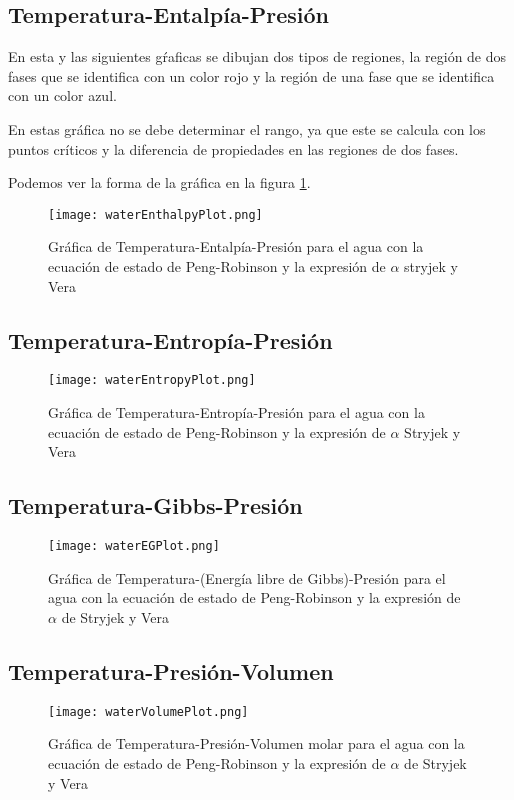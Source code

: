 	\subsection{Temperatura-Entalpía-Presión}\label{subsec:tep}

		En esta y las siguientes gŕaficas se dibujan dos tipos de regiones, la región de dos fases que se identifica con un color rojo y la región de una fase que se identifica con un color azul.

		En estas gráfica no se debe determinar el rango, ya que este se calcula con los puntos críticos y la diferencia de propiedades en las regiones de dos fases. 

		Podemos ver la forma de la gráfica en la figura \ref{fig:hplot}.

		\begin{figure}[!h]
			\texttt{[image: waterEnthalpyPlot.png]}
			\caption{Gráfica de Temperatura-Entalpía-Presión para el agua con la ecuación de estado de Peng-Robinson y la expresión de $\alpha$ stryjek y Vera}
			\label{fig:hplot}
		\end{figure}
	\subsection{Temperatura-Entropía-Presión}\label{subsec:tsp}	
		\begin{figure}[H]
			\texttt{[image: waterEntropyPlot.png]}
			\caption{Gráfica de Temperatura-Entropía-Presión para el agua con la ecuación de estado de Peng-Robinson y la expresión de $\alpha$ Stryjek y Vera}
			\label{fig:splot}
		\end{figure}
	\subsection{Temperatura-Gibbs-Presión}\label{subsec:tgp}
		\begin{figure}[H]
			\texttt{[image: waterEGPlot.png]}
			\caption{Gráfica de Temperatura-(Energía libre de Gibbs)-Presión para el agua con la ecuación de estado de Peng-Robinson y la expresión de $\alpha$ de Stryjek y Vera}
			\label{gplot}
		\end{figure}
	\subsection{Temperatura-Presión-Volumen}\label{subsec:tpv}
		\begin{figure}[H]
			\texttt{[image: waterVolumePlot.png]}
			\caption{Gráfica de Temperatura-Presión-Volumen molar para el agua con la ecuación de estado de Peng-Robinson y la expresión de $\alpha$ de Stryjek y Vera}
			\label{vplot}
		\end{figure}
	
